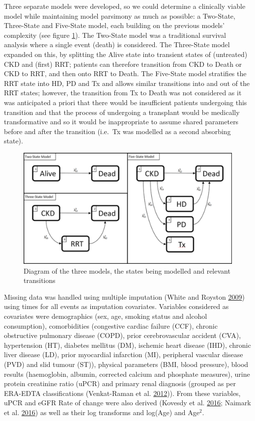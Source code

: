 \documentclass[
]{article}
\begin{document}
Three separate models were developed, so we could determine a clinically viable model while maintaining model parsimony as much as possible: a Two-State, Three-State and Five-State model, each building on the previous models' complexity (see figure \ref{fig:State-Diagram}). The Two-State model was a traditional survival analysis where a single event (death) is considered. The Three-State model expanded on this, by splitting the Alive state into transient states of (untreated) CKD and (first) RRT; patients can therefore transition from CKD to Death or CKD to RRT, and then onto RRT to Death. The Five-State model stratifies the RRT state into HD, PD and Tx and allows similar transitions into and out of the RRT states; however, the transition from Tx to Death was not considered as it was anticipated a priori that there would be insufficient patients undergoing this transition and that the process of undergoing a transplant would be medically transformative and so it would be inappropriate to assume shared parameters before and after the transition (i.e.~Tx was modelled as a second absorbing state).
\begin{figure}

{\centering \includegraphics[width=0.9\linewidth]{figure/Dev_Paper_State_Diagrams} 

}

\caption{Diagram of the three models, the states being modelled and relevant transitions}\label{fig:State-Diagram}
\end{figure}
Missing data was handled using multiple imputation (White and Royston \protect\hyperlink{ref-white_imputing_2009}{2009}) using times for all events as imputation covariates. Variables considered as covariates were demographics (sex, age, smoking status and alcohol consumption), comorbidities (congestive cardiac failure (CCF), chronic obstructive pulmonary disease (COPD), prior cerebrovascular accident (CVA), hypertension (HT), diabetes mellitus (DM), ischemic heart disease (IHD), chronic liver disease (LD), prior myocardial infarction (MI), peripheral vascular disease (PVD) and slid tumour (ST)), physical parameters (BMI, blood pressure), blood results (haemoglobin, albumin, corrected calcium and phosphate measures), urine protein creatinine ratio (uPCR) and primary renal diagnosis (grouped as per ERA-EDTA classifications (Venkat-Raman et al. \protect\hyperlink{ref-venkat-raman_new_2012}{2012})). From these variables, uPCR and eGFR Rate of change were also derived (Kovesdy et al. \protect\hyperlink{ref-kovesdy_past_2016}{2016}; Naimark et al. \protect\hyperlink{ref-naimark_past_2016}{2016}) as well as their log transforms and log(Age) and Age\(^2\).
\end{document}
